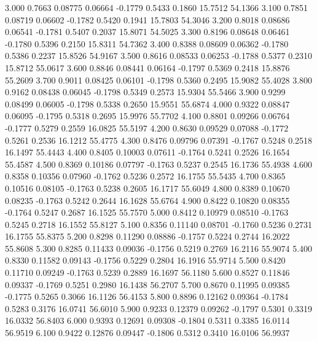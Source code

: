    3.000   0.7663   0.08775   0.06664  -0.1779   0.5433   0.1860  15.7512  54.1366
   3.100   0.7851   0.08719   0.06602  -0.1782   0.5420   0.1941  15.7803  54.3046
   3.200   0.8018   0.08686   0.06541  -0.1781   0.5407   0.2037  15.8071  54.5025
   3.300   0.8196   0.08648   0.06461  -0.1780   0.5396   0.2150  15.8311  54.7362
   3.400   0.8388   0.08609   0.06362  -0.1780   0.5386   0.2237  15.8526  54.9167
   3.500   0.8616   0.08533   0.06253  -0.1788   0.5377   0.2310  15.8712  55.0617
   3.600   0.8846   0.08441   0.06164  -0.1797   0.5369   0.2418  15.8876  55.2609
   3.700   0.9011   0.08425   0.06101  -0.1798   0.5360   0.2495  15.9082  55.4028
   3.800   0.9162   0.08438   0.06045  -0.1798   0.5349   0.2573  15.9304  55.5466
   3.900   0.9299   0.08499   0.06005  -0.1798   0.5338   0.2650  15.9551  55.6874
   4.000   0.9322   0.08847   0.06095  -0.1795   0.5318   0.2695  15.9976  55.7702
   4.100   0.8801   0.09266   0.06764  -0.1777   0.5279   0.2559  16.0825  55.5197
   4.200   0.8630   0.09529   0.07088  -0.1772   0.5261   0.2536  16.1212  55.4775
   4.300   0.8476   0.09796   0.07391  -0.1767   0.5248   0.2518  16.1497  55.4443
   4.400   0.8405   0.10003   0.07611  -0.1764   0.5241   0.2526  16.1654  55.4587
   4.500   0.8369   0.10186   0.07797  -0.1763   0.5237   0.2545  16.1736  55.4938
   4.600   0.8358   0.10356   0.07960  -0.1762   0.5236   0.2572  16.1755  55.5435
   4.700   0.8365   0.10516   0.08105  -0.1763   0.5238   0.2605  16.1717  55.6049
   4.800   0.8389   0.10670   0.08235  -0.1763   0.5242   0.2644  16.1628  55.6764
   4.900   0.8422   0.10820   0.08355  -0.1764   0.5247   0.2687  16.1525  55.7570
   5.000   0.8412   0.10979   0.08510  -0.1763   0.5245   0.2718  16.1552  55.8127
   5.100   0.8356   0.11140   0.08701  -0.1760   0.5236   0.2731  16.1755  55.8375
   5.200   0.8298   0.11290   0.08886  -0.1757   0.5224   0.2744  16.2022  55.8608
   5.300   0.8285   0.11433   0.09036  -0.1756   0.5219   0.2769  16.2116  55.9074
   5.400   0.8330   0.11582   0.09143  -0.1756   0.5229   0.2804  16.1916  55.9714
   5.500   0.8420   0.11710   0.09249  -0.1763   0.5239   0.2889  16.1697  56.1180
   5.600   0.8527   0.11846   0.09337  -0.1769   0.5251   0.2980  16.1438  56.2707
   5.700   0.8670   0.11995   0.09385  -0.1775   0.5265   0.3066  16.1126  56.4153
   5.800   0.8896   0.12162   0.09364  -0.1784   0.5283   0.3176  16.0741  56.6010
   5.900   0.9233   0.12379   0.09262  -0.1797   0.5301   0.3319  16.0332  56.8403
   6.000   0.9393   0.12691   0.09308  -0.1804   0.5311   0.3385  16.0114  56.9519
   6.100   0.9422   0.12876   0.09447  -0.1806   0.5312   0.3410  16.0106  56.9937
